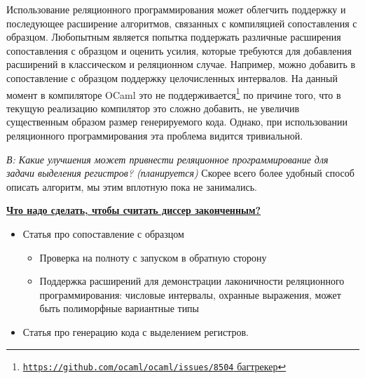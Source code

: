 Использование реляционного программирования может облегчить поддержку и последующее расширение алгоритмов, связанных с компиляцией сопоставления с образцом. Любопытным является попытка поддержать различные расширения сопоставления с образцом и оценить усилия, которые требуются для добавления расширений в классическом и реляционном случае. Например, можно добавить в сопоставление с образцом поддержку целочисленных интервалов. На данный момент в компиляторе OCaml это не поддерживается\footnote{\href{https://github.com/ocaml/ocaml/issues/8504}{\texttt{https://github.com/ocaml/ocaml/issues/8504} багтрекер}} по причине того, что в текущую реализацию компилятор это сложно добавить, не увеличив существенным образом размер генерируемого кода. Однако, при использовании реляционного программирования эта проблема видится тривиальной.

\emph{В: Какие улучшения может привнести реляционное программирование для задачи выделения регистров? (планируется)}
Скорее всего более удобный способ описать алгоритм, мы этим вплотную пока не занимались.

{\underline{\textbf{Что надо сделать, чтобы считать диссер законченным?}}}
\begin{itemize}
\item Статья про сопоставление с образцом
\begin{itemize}
\item Проверка на полноту с запуском в обратную сторону
\item  Поддержка расширений для демонстрации лаконичности реляционного программирования: числовые интервалы, охранные выражения, может быть полиморфные вариантные типы
\end{itemize}
\item Статья про генерацию кода с выделением регистров.
\end{itemize}

{\influence}
%

